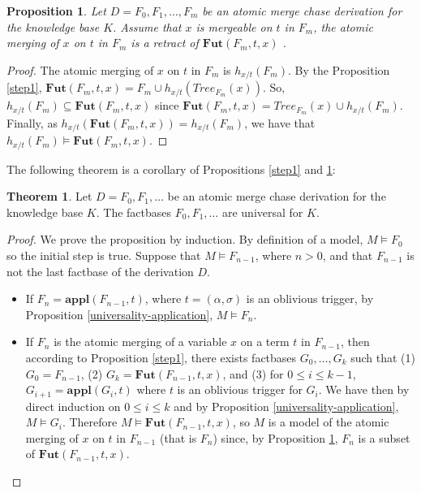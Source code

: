 \documentclass{article}
\newtheorem{proposition}{Proposition}[section]
\theoremstyle{definition}
\newtheorem{theorem}{Theorem}[section]
\theoremstyle{remark}
\newcommand{\Appl}{\textbf{appl}}
\newcommand{\Tree}{\textit{Tree}}
\newcommand{\Fut}{\textbf{Fut}}
\begin{document}
\begin{proposition} \label{step2}
Let $D = F_0,F_1,\ldots,F_m$ be an atomic merge chase derivation for the knowledge base $K$. Assume that $x$ is mergeable on $t$ in $F_m$, the atomic merging of $x$ on $t$ in $F_m$ is a retract of $\Fut(F_m,t,x)$ .
\end{proposition}

\begin{proof}
The atomic merging of $x$ on $t$ in $F_m$ is $h_{x/t}(F_m)$. By the Proposition \ref{step1}, $\Fut(F_m,t,x)= F_m \cup h_{x/t}(\Tree_{F_m}(x))$. So, $h_{x/t}(F_m) \subseteq \Fut(F_m,t,x) $ since $\Fut(F_m,t,x) = \Tree_{F_m}(x) \cup h_{x/t}(F_m)$. Finally, as $h_{x/t}(\Fut(F_m,t,x)) = h_{x/t}(F_m)$, we have that $h_{x/t}(F_m) \vDash \Fut(F_m,t,x)$.
\end{proof}

The following theorem is a corollary of Propositions \ref{step1} and \ref{step2}:

\begin{theorem} \label{universality atomic merge}
Let $D = F_0,F_1,\ldots$ be an atomic merge chase derivation for the knowledge base $K$. The factbases $F_0,F_1,\ldots$ are universal for $K$.
\end{theorem}

\begin{proof}
We prove the proposition by induction. By definition of a model, $M \vDash F_0$ so the initial step is true.
Suppose that $M \vDash F_{n-1}$, where $n >0$, and that $F_{n-1}$ is not the last factbase of the derivation $D$.
\begin{itemize}
\item If $F_n=\Appl(F_{n-1},t)$, where $t=(\alpha,\sigma)$ is an oblivious trigger, by Proposition \ref{universality-application}, $M \vDash F_n$.



\item If $F_n$ is the atomic merging of a variable $x$ on a term $t$ in $F_{n-1}$, then according to Proposition \ref{step1}, there exists factbases $G_0,\ldots,G_k$ such that (1) $G_0 = F_{n-1}$, (2) $G_k = \Fut(F_{n-1},t,x)$, and (3) for $0 \leq i \leq k-1$, $G_{i+1} =\Appl(G_i,t)$ where $t$ is an oblivious trigger for $G_i$. We have then by direct induction on $0 \leq i \leq k$ and by Proposition \ref{universality-application}, $M \vDash G_i$. Therefore $M \vDash \Fut(F_{n-1},t,x)$, so $M$ is a model of the atomic merging of $x$ on $t$ in $F_{n-1}$ (that is $F_n$) since, by Proposition \ref{step2}, $F_n$ is a subset of $\Fut(F_{n-1},t,x)$.
\end{itemize}
\end{proof}
\end{document}
